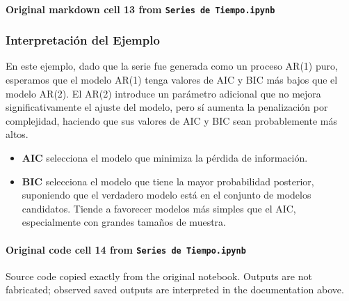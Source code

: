 \documentclass[
  11pt,
]{article}
\providecommand{\tightlist}{%
  \setlength{\itemsep}{0pt}\setlength{\parskip}{0pt}}
\begin{document}
\paragraph{\texorpdfstring{Original markdown cell 13 from \texttt{Series\ de\ Tiempo.ipynb}}{Original markdown cell 13 from Series de Tiempo.ipynb}}\label{original-markdown-cell-13-from-series-de-tiempoipynb}

\subsubsection{Interpretación del Ejemplo}\label{interpretaciuxf3n-del-ejemplo}

En este ejemplo, dado que la serie fue generada como un proceso AR(1) puro, esperamos que el modelo AR(1) tenga valores de AIC y BIC más bajos que el modelo AR(2). El AR(2) introduce un parámetro adicional que no mejora significativamente el ajuste del modelo, pero sí aumenta la penalización por complejidad, haciendo que sus valores de AIC y BIC sean probablemente más altos.

\begin{itemize}
\tightlist
\item
  \textbf{AIC} selecciona el modelo que minimiza la pérdida de información.
\item
  \textbf{BIC} selecciona el modelo que tiene la mayor probabilidad posterior, suponiendo que el verdadero modelo está en el conjunto de modelos candidatos. Tiende a favorecer modelos más simples que el AIC, especialmente con grandes tamaños de muestra.
\end{itemize}

\paragraph{\texorpdfstring{Original code cell 14 from \texttt{Series\ de\ Tiempo.ipynb}}{Original code cell 14 from Series de Tiempo.ipynb}}\label{original-code-cell-14-from-series-de-tiempoipynb}

Source code copied exactly from the original notebook. Outputs are not fabricated; observed saved outputs are interpreted in the documentation above.
\end{document}
